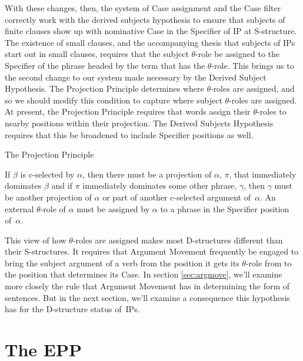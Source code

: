 With these changes, then, the system of Case assignment and the Case filter correctly work with the derived subjects hypothesis to ensure that subjects of finite clauses show up with nominative Case in the Specifier of IP at S-structure. The existence of small clauses, and the accompanying thesis that subjects of IPs start out in small clauses, requires that the subject \mbox{$\theta$-role} be assigned to the Specifier of the phrase headed by the term that has the \mbox{$\theta$-role}. This brings us to the second change to our system made necessary by the Derived Subject Hypothesis. The Projection Principle determines where \mbox{$\theta$-roles} are assigned, and so we should modify this condition to capture where subject \mbox{$\theta$-roles} are assigned. At present, the Projection Principle requires that words assign their \mbox{$\theta$-roles} to nearby positions within their projection. The Derived Subjects Hypothesis requires that this be broadened to include Specifier positions as well. 
\pagebreak
\begin{exe}
\ex \label{ex3:newproprin} The Projection Principle
\begin{xlist}
	\ex If $\beta$ is c-selected by $\alpha$, then there must be a projection of $\alpha$, $\pi$, that immediately dominates $\beta$ and if $\pi$ immediately dominates some other phrase, $\gamma$, then $\gamma$ must be another projection of $\alpha$ or part of another c-selected argument of~$\alpha$.
	\ex An external $\theta$-role of $\alpha$ must be assigned by $\alpha$ to a phrase in the Specifier position of~$\alpha$.
\end{xlist}
\end{exe}

This view of how $\theta$-roles are assigned makes most D-structures different than their S-structures. It requires that Argument Movement frequently be engaged to bring the subject argument of a verb from the position it gets its $\theta$-role from to the position that determines its Case. In section \ref{sec:argmove}, we'll examine more closely the rule that Argument Movement has in determining the form of sentences. But in the next section, we'll examine a consequence this hypothesis has for the D-structure status of~IPs.

\section{The EPP}
\label{sec:epp}


